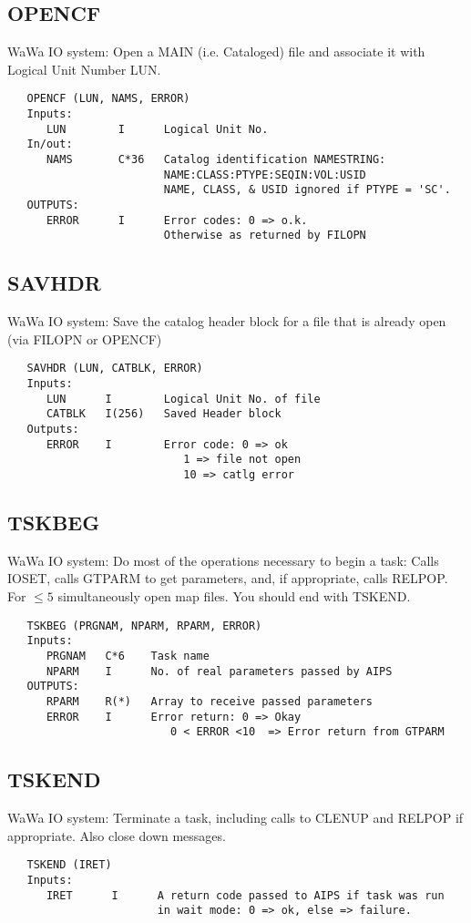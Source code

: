 \subsection{OPENCF}
WaWa IO system: Open a MAIN (i.e. Cataloged) file and associate
it with Logical Unit Number LUN.
\begin{verbatim}
   OPENCF (LUN, NAMS, ERROR)
   Inputs:
      LUN        I      Logical Unit No.
   In/out:
      NAMS       C*36   Catalog identification NAMESTRING:
                        NAME:CLASS:PTYPE:SEQIN:VOL:USID
                        NAME, CLASS, & USID ignored if PTYPE = 'SC'.
   OUTPUTS:
      ERROR      I      Error codes: 0 => o.k.
                        Otherwise as returned by FILOPN

\end{verbatim}

\subsection{SAVHDR}
WaWa IO system: Save the catalog header block for a file that
is already open (via FILOPN or OPENCF)
\begin{verbatim}
   SAVHDR (LUN, CATBLK, ERROR)
   Inputs:
      LUN      I        Logical Unit No. of file
      CATBLK   I(256)   Saved Header block
   Outputs:
      ERROR    I        Error code: 0 => ok
                           1 => file not open
                           10 => catlg error

\end{verbatim}

\subsection{TSKBEG}
WaWa IO system: Do most of the operations necessary to begin a
task:  Calls IOSET, calls GTPARM to get parameters, and, if
appropriate, calls RELPOP.  For $\le 5$ simultaneously open map files.
You should end with TSKEND.
\begin{verbatim}
   TSKBEG (PRGNAM, NPARM, RPARM, ERROR)
   Inputs:
      PRGNAM   C*6    Task name
      NPARM    I      No. of real parameters passed by AIPS
   OUTPUTS:
      RPARM    R(*)   Array to receive passed parameters
      ERROR    I      Error return: 0 => Okay
                         0 < ERROR <10  => Error return from GTPARM

\end{verbatim}

\subsection{TSKEND}
WaWa IO system: Terminate a task, including calls to CLENUP and
RELPOP if appropriate.  Also close down messages.
\begin{verbatim}
   TSKEND (IRET)
   Inputs:
      IRET      I      A return code passed to AIPS if task was run
                       in wait mode: 0 => ok, else => failure.

\end{verbatim}

